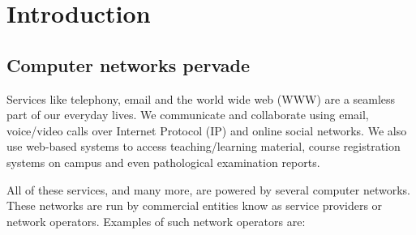 \chapter{Introduction}
\label{chap:intro}

\section{Computer networks pervade}
Services like telephony, email and the world wide web (WWW) are a seamless part of our everyday lives. We communicate and collaborate using email, voice/video calls over Internet Protocol (IP) and online social networks. We also use web-based systems to access teaching/learning material, course registration systems on campus and even pathological examination reports. 

All of these services, and many more, are powered by several computer networks. These networks are run by commercial entities know as service providers or network operators. Examples of such network operators are: 

